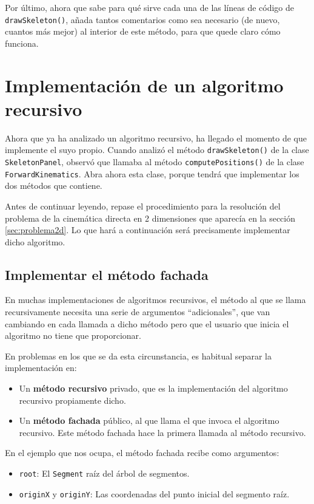 \documentclass[10pt,a4paper,spanish]{article}
\newcommand{\code}[1]{\texttt{#1}}
\begin{document}
Por último, ahora que sabe para qué sirve cada una de las líneas de código de \code{drawSkeleton()}, añada tantos comentarios como sea necesario (de nuevo, cuantos más mejor) al interior de este método, para que quede claro cómo funciona.

\section{Implementación de un algoritmo recursivo}
\label{sec:recursividadImpl}

Ahora que ya ha analizado un algoritmo recursivo, ha llegado el momento de que implemente el suyo propio. Cuando analizó el método \code{drawSkeleton()} de la clase \code{SkeletonPanel}, observó que llamaba al método \code{computePositions()} de la clase \code{ForwardKinematics}. Abra ahora esta clase, porque tendrá que implementar los dos métodos que contiene.

Antes de continuar leyendo, repase el procedimiento para la resolución del problema de la cinemática directa en 2 dimensiones que aparecía en la sección \ref{sec:problema2d}. Lo que hará a continuación será precisamente implementar dicho algoritmo.

\subsection{Implementar el método fachada}

En muchas implementaciones de algoritmos recursivos, el método al que se llama recursivamente necesita una serie de argumentos ``adicionales'', que van cambiando en cada llamada a dicho método pero que el usuario que inicia el algoritmo no tiene que proporcionar.

En problemas en los que se da esta circunstancia, es habitual separar la implementación en:

\begin{itemize}
    \item Un \textbf{método recursivo} privado, que es la implementación del algoritmo recursivo propiamente dicho.
    \item Un \textbf{método fachada} público, al que llama el que invoca el algoritmo recursivo. Este método fachada hace la primera llamada al método recursivo.
\end{itemize}

En el ejemplo que nos ocupa, el método fachada recibe como argumentos:

\begin{itemize}
    \item \code{root}: El \code{Segment} raíz del árbol de segmentos.
    \item \code{originX} y \code{originY}: Las coordenadas del punto inicial del segmento raíz.
\end{itemize}
\end{document}
